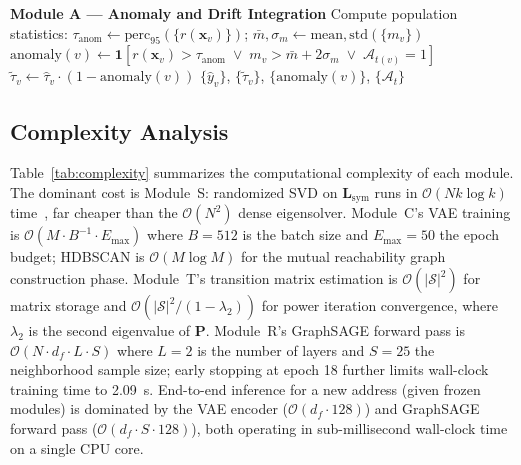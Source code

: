 \begin{algorithm}[t]
\begin{algorithmic}[1]
\Statex
\Statex \textbf{Module A — Anomaly and Drift Integration}
\State Compute population statistics:
       $\tau_{\mathrm{anom}} \leftarrow \mathrm{perc}_{95}(\{r(\mathbf{x}_v)\})$;\quad
       $\bar{m}, \sigma_m \leftarrow \mathrm{mean}, \mathrm{std}(\{m_v\})$
    \State $\mathrm{anomaly}(v) \leftarrow
            \mathbf{1}\!\left[
              r(\mathbf{x}_v) > \tau_{\mathrm{anom}}
              \;\lor\;
              m_v > \bar{m} + 2\sigma_m
              \;\lor\;
              \mathcal{A}_{t(v)} = 1
            \right]$
    \State $\tilde{\tau}_v \leftarrow \hat{\tau}_v \cdot
            (1 - \mathrm{anomaly}(v))$
\EndFor
\State \Return $\{\hat{y}_v\}$, $\{\tilde{\tau}_v\}$,
               $\{\mathrm{anomaly}(v)\}$, $\{\mathcal{A}_t\}$
\end{algorithmic}
\end{algorithm}

\subsection{Complexity Analysis}
\label{sec:complexity}

Table~\ref{tab:complexity} summarizes the computational complexity of each
module.
The dominant cost is Module~S: randomized SVD on $\mathbf{L}_{\mathrm{sym}}$
runs in $\mathcal{O}(N k \log k)$ time~\cite{halko2011finding}, far cheaper
than the $\mathcal{O}(N^2)$ dense eigensolver.
Module~C's VAE training is $\mathcal{O}(M \cdot B^{-1} \cdot E_{\max})$
where $B = 512$ is the batch size and $E_{\max} = 50$ the epoch budget;
HDBSCAN is $\mathcal{O}(M \log M)$ for the mutual reachability graph
construction phase.
Module~T's transition matrix estimation is $\mathcal{O}(|\mathcal{S}|^2)$
for matrix storage and $\mathcal{O}(|\mathcal{S}|^2 / (1-\lambda_2))$ for
power iteration convergence, where $\lambda_2$ is the second eigenvalue of
$\mathbf{P}$.
Module~R's GraphSAGE forward pass is $\mathcal{O}(N \cdot d_f \cdot L \cdot S)$
where $L = 2$ is the number of layers and $S = 25$ the neighborhood sample
size; early stopping at epoch 18 further limits wall-clock training time to
\SI{2.09}{\second}.
End-to-end inference for a new address (given frozen modules) is dominated by
the VAE encoder ($\mathcal{O}(d_f \cdot 128)$) and GraphSAGE forward pass
($\mathcal{O}(d_f \cdot S \cdot 128)$), both operating in sub-millisecond
wall-clock time on a single CPU core.

